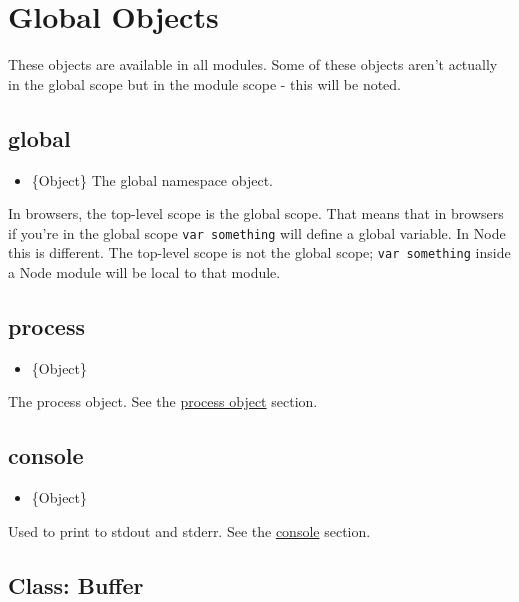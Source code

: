 \section{Global Objects}\label{global-objects}

These objects are available in all modules. Some of these objects aren't
actually in the global scope but in the module scope - this will be
noted.

\subsection{global}\label{global}

\begin{itemize}
\itemsep1pt\parskip0pt
\item
  \{Object\} The global namespace object.
\end{itemize}

In browsers, the top-level scope is the global scope. That means that in
browsers if you're in the global scope \texttt{var\ something} will
define a global variable. In Node this is different. The top-level scope
is not the global scope; \texttt{var\ something} inside a Node module
will be local to that module.

\subsection{process}\label{process}

\begin{itemize}
\itemsep1pt\parskip0pt
\item
  \{Object\}
\end{itemize}

The process object. See the \href{process.html\#process_process}{process
object} section.

\subsection{console}\label{console}

\begin{itemize}
\itemsep1pt\parskip0pt
\item
  \{Object\}
\end{itemize}

Used to print to stdout and stderr. See the \href{console.html}{console}
section.

\subsection{Class: Buffer}\label{class-buffer}


